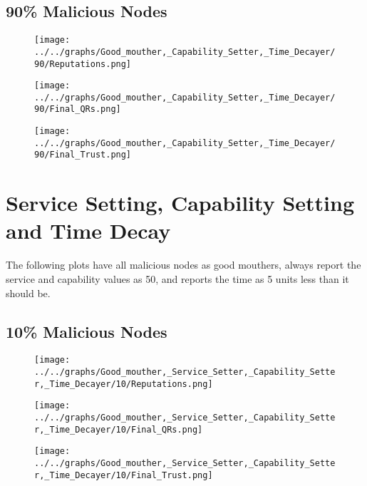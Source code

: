 \begin{minipage}[t]{0.49\columnwidth}
\subsection*{90\% Malicious Nodes}
    \begin{figure}[H]
        \centering
        \texttt{[image: ../../graphs/Good\_mouther,\_Capability\_Setter,\_Time\_Decayer/90/Reputations.png]}
    \end{figure}
    \begin{figure}[H]
        \centering
        \texttt{[image: ../../graphs/Good\_mouther,\_Capability\_Setter,\_Time\_Decayer/90/Final\_QRs.png]}
    \end{figure}
\end{minipage}
\begin{minipage}[t]{0.49\columnwidth}
    \begin{figure}[H]
        \centering
        \texttt{[image: ../../graphs/Good\_mouther,\_Capability\_Setter,\_Time\_Decayer/90/Final\_Trust.png]}
    \end{figure}
\end{minipage}
\newpage

\section*{Service Setting, Capability Setting and Time Decay}
The following plots have all malicious nodes as good mouthers, always
report the service and capability values as 50, and reports the time as
5 units less than it should be.
\\
\begin{minipage}[t]{0.49\columnwidth}
\subsection*{10\% Malicious Nodes}
    \begin{figure}[H]
        \centering
        \texttt{[image: ../../graphs/Good\_mouther,\_Service\_Setter,\_Capability\_Setter,\_Time\_Decayer/10/Reputations.png]}
    \end{figure}
    \begin{figure}[H]
        \centering
        \texttt{[image: ../../graphs/Good\_mouther,\_Service\_Setter,\_Capability\_Setter,\_Time\_Decayer/10/Final\_QRs.png]}
    \end{figure}
\end{minipage}
\begin{minipage}[t]{0.49\columnwidth}
    \begin{figure}[H]
        \centering
        \texttt{[image: ../../graphs/Good\_mouther,\_Service\_Setter,\_Capability\_Setter,\_Time\_Decayer/10/Final\_Trust.png]}
    \end{figure}
\end{minipage}

